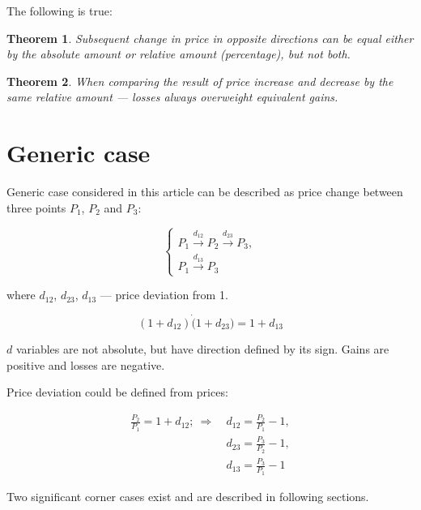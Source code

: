 \documentclass[a4paper]{article}
\newtheorem*{theorem}{Theorem}
\begin{document}
The following is true:

\begin{theorem}
Subsequent change in price in opposite directions
can be equal either by the absolute amount
or relative amount (percentage), but not both.
\end{theorem}

\begin{theorem}
When comparing the result of price increase and decrease by the same relative
amount --- losses always overweight equivalent gains.
\end{theorem}

\section*{Generic case}

Generic case considered in this article can be described as price change
between three points $P_1$, $P_2$ and $P_3$:

\begin{equation}
  \begin{cases}
    P_1 \xrightarrow{d_{12}} P_2 \xrightarrow{d_{23}} P_3,\\
    P_1 \xrightarrow{d_{13}} P_3
  \end{cases}
\end{equation}

where $d_{12}$, $d_{23}$, $d_{13}$ --- price deviation from 1.

\begin{equation}
  (1 + d_{12}) \dot (1 + d_{23}) = 1 + d_{13}
\end{equation}

$d$ variables are not absolute, but have direction defined by its sign.
Gains are positive and losses are negative.

Price deviation could be defined from prices:

\begin{subequations}
\begin{align}
  \frac{P_2}{P_1} = 1 + d_{12}; \ \Rightarrow \ &d_{12} = \frac{P_2}{P_1} - 1,\\
                                                &d_{23} = \frac{P_3}{P_2} - 1,\\
                                                &d_{13} = \frac{P_3}{P_1} - 1
\end{align}
\label{eq:p1_p2_p3}
\end{subequations}

Two significant corner cases exist and are described in following sections.
\end{document}
